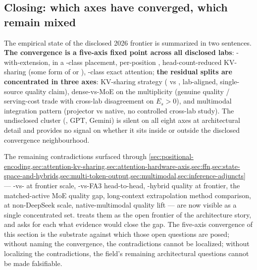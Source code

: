 \subsection{Closing: which axes have converged, which remain mixed}
\label{sec:snapshot-closing}

The empirical state of the disclosed 2026 frontier is summarized in
two sentences. \textbf{The convergence is a five-axis fixed point
across all disclosed labs}: -with-extension,  in a
-class placement,  per-position , head-count-reduced
KV-sharing (some form of  or ), -class exact
attention; \textbf{the residual splits are concentrated in three
axes}: KV-sharing strategy ( vs , lab-aligned, single-source
quality claim), dense-vs-MoE on the  multiplicity (genuine
quality / serving-cost trade with cross-lab disagreement on
$E_s > 0$), and multimodal integration pattern (projector vs native,
no controlled cross-lab study). The undisclosed cluster (,
GPT, Gemini) is silent on all eight axes at architectural detail
and provides no signal on whether it sits inside or outside the
disclosed convergence neighbourhood.

The remaining contradictions surfaced through
\cref{sec:positional-encoding,sec:attention-kv-sharing,sec:attention-hardware-axis,sec:ffn,sec:state-space-and-hybrids,sec:multi-token-output,sec:multimodal,sec:inference-adjuncts}
--- -vs- at frontier scale, -vs-FA3 head-to-head,
-hybrid quality at frontier, the matched-active MoE quality gap,
long-context extrapolation method comparison,  at non-DeepSeek
scale, native-multimodal quality lift --- are now visible as a
single concentrated set.  treats them as
the open frontier of the architecture story, and asks for each what
evidence would close the gap. The five-axis convergence of this
section is the substrate against which those open questions are
posed; without naming the convergence, the contradictions cannot be
localized; without localizing the contradictions, the field's
remaining architectural questions cannot be made falsifiable.
